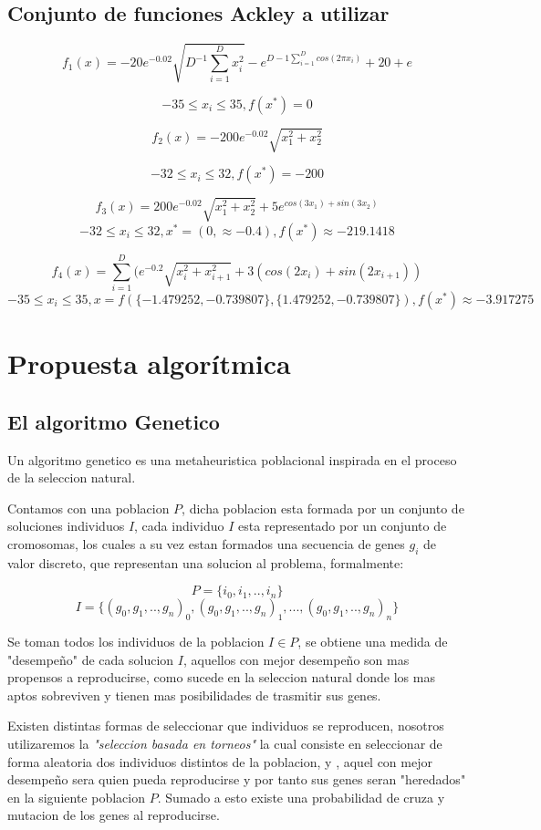 \documentclass[10pt]{article}
\begin{document}
\subsection{Conjunto de funciones Ackley a utilizar}
 
$$f_1(x) = -20e^{-0.02}\sqrt{D^{-1}\sum_{i=1}^{D}x_{i}^2}-e^{D-1\sum_{i=1}^{D}cos(2\pi x_i)}+20+e$$

$$-35\leq x_i \leq 35, f(x^*) = 0$$


$$f_2(x) = -200e^{-0.02}\sqrt{x_1^2+x_2^2}$$

$$-32\leq x_i \leq 32, f(x^*) = -200$$

$$f_3(x) = 200e^{-0.02}\sqrt{x_1^2+x_2^2}+5e^{cos(3x_1)+sin(3x_2)}$$
$$-32\leq x_i \leq 32, x^* = (0, \approx -0.4), f(x^*) \approx -219.1418$$

$$f_4(x) = \sum_{i=1}^{D}(e^{-0.2}\sqrt{x_i^2+x_{i+1}^2}+3(cos(2x_i)+sin(2x_{i+1}))$$
$$-35\leq x_i \leq 35, x=f(\{-1.479252,-0.739807\},\{1.479252,-0.739807\}), f(x^*) \approx -3.917275$$ 

\section{Propuesta algorítmica} %

\subsection{El algoritmo Genetico}

Un algoritmo genetico es una metaheuristica poblacional inspirada en el proceso de la seleccion natural.

Contamos con una poblacion $P$, dicha poblacion esta formada por un conjunto de soluciones individuos $I$, cada individuo $I$ esta representado por un conjunto de cromosomas, los cuales a su vez estan formados una secuencia de genes $g_i$ de valor discreto, que representan una solucion al problema, formalmente:

$$P =\{i_0,i_1,..,i_n\}$$
$$I =\{(g_0,g_1,..,g_n)_0,(g_0,g_1,..,g_n)_1,...,(g_0,g_1,..,g_n)_n\}$$

Se toman todos los individuos de la poblacion $I \in P$, se obtiene una medida de "desempeño" de cada solucion $I$, aquellos con mejor desempeño son mas propensos a reproducirse, como sucede en la seleccion natural donde los mas aptos sobreviven y tienen mas posibilidades de trasmitir sus genes.

Existen distintas formas de seleccionar que individuos se reproducen, nosotros utilizaremos la \textit{"seleccion basada en torneos"} la cual consiste en seleccionar de forma aleatoria dos individuos distintos de la poblacion, y , aquel con mejor desempeño sera quien pueda reproducirse y por tanto sus genes seran "heredados" en la siguiente poblacion $P$. Sumado a esto existe una probabilidad de cruza y mutacion de los genes al reproducirse.
\end{document}
